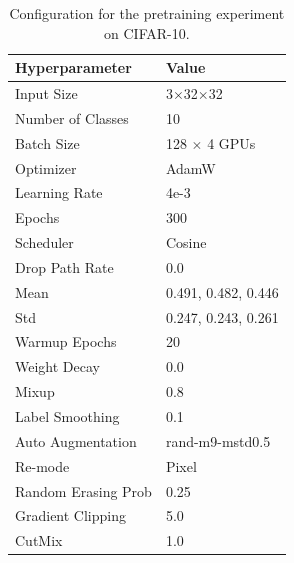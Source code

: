 \documentclass{article} %
\theoremstyle{plain}
\theoremstyle{definition}
\theoremstyle{remark}
\begin{document}
\begin{table}[!htbp]
\caption{Configuration for the pretraining experiment on CIFAR-10.}
\label{tab:cifar_config}
\vskip 0.15in
\begin{center}
\begin{small}
\begin{tabular}{ll}
\toprule
\textbf{Hyperparameter} & \textbf{Value} \\
\midrule
Input Size & 3$\times$32$\times$32 \\
Number of Classes & 10 \\
Batch Size & 128 $\times$ 4 GPUs \\
Optimizer & AdamW \\
Learning Rate & 4e-3 \\
Epochs & 300 \\
Scheduler & Cosine \\
Drop Path Rate & 0.0 \\
Mean & 0.491, 0.482, 0.446 \\
Std & 0.247, 0.243, 0.261 \\
Warmup Epochs & 20 \\
Weight Decay & 0.0 \\
Mixup & 0.8 \\
Label Smoothing & 0.1 \\
Auto Augmentation & rand-m9-mstd0.5 \\
Re-mode & Pixel \\
Random Erasing Prob & 0.25 \\
Gradient Clipping & 5.0 \\
CutMix & 1.0 \\
\bottomrule
\end{tabular}
\end{small}
\end{center}
\vskip -0.1in
\end{table}
\newpage
\end{document}
